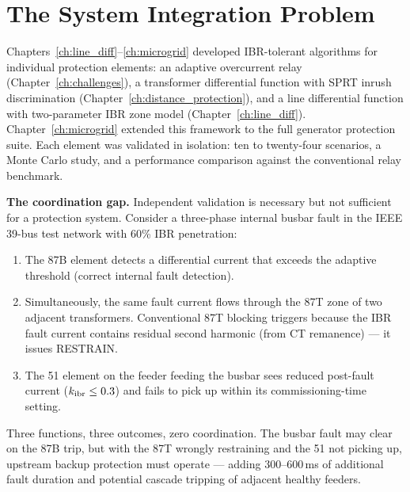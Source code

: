 \section{The System Integration Problem}
\label{sec:ch7_intro}

Chapters~\ref{ch:line_diff}--\ref{ch:microgrid} developed IBR-tolerant
algorithms for individual protection elements: an adaptive overcurrent relay
(Chapter~\ref{ch:challenges}), a transformer differential function
with SPRT inrush discrimination (Chapter~\ref{ch:distance_protection}), and
a line differential function with two-parameter IBR zone model
(Chapter~\ref{ch:line_diff}).
Chapter~\ref{ch:microgrid} extended this framework to the full generator
protection suite.
Each element was validated in isolation: ten to twenty-four scenarios,
a Monte Carlo study, and a performance comparison against the conventional
relay benchmark.

\textbf{The coordination gap.}  Independent validation is necessary but not
sufficient for a protection system.  Consider a three-phase internal busbar
fault in the IEEE 39-bus test network with 60\% IBR penetration:
\begin{enumerate}
  \item The 87B element detects a differential current that exceeds
        the adaptive threshold (correct internal fault detection).
  \item Simultaneously, the same fault current flows through the 87T
        zone of two adjacent transformers.  Conventional 87T blocking
        triggers because the IBR fault current contains residual
        second harmonic (from CT remanence) — it issues RESTRAIN.
  \item The 51 element on the feeder feeding the busbar sees reduced
        post-fault current ($k_{\rm ibr} \leq 0.3$) and fails to pick
        up within its commissioning-time setting.
\end{enumerate}
Three functions, three outcomes, zero coordination.  The busbar fault may
clear on the 87B trip, but with the 87T wrongly restraining and the 51 not
picking up, upstream backup protection must operate — adding 300--600\,ms
of additional fault duration and potential cascade tripping of adjacent healthy
feeders.

